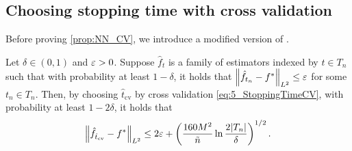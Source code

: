 

\subsection{Choosing stopping time with cross validation}
Before proving \cref{prop:NN_CV}, we introduce a modified version of \citet[Theorem 3]{caponnetto2010_CrossvalidationBased}.
\begin{proposition}
  \label{prop:E_CV}
  Let $\delta \in (0,1)$ and $\varepsilon > 0$.
  Suppose $\hat{f}_t$ is a family of estimators indexed by $t \in T_n$ such that with probability at least $1-\delta$,
  it holds that $\norm{\hat{f}_{t_n} - f^*}_{L^2} \leq \varepsilon$ for some $t_n \in T_n$.
  Then, by choosing  $\hat{t}_{\mathrm{cv}}$ by cross validation
  \cref{eq:5_StoppingTimeCV}, with probability at least $1-2\delta$, it holds that
  \begin{align}
    \norm{\hat{f}_{\hat{t}_{\mathrm{cv}}} - f^*}_{L^2} \leq 2\varepsilon + \left( \frac{160 M^2}{\tilde{n}} \ln \frac{2\abs{T_n}}{\delta} \right)^{1/2}.
  \end{align}
\end{proposition}

